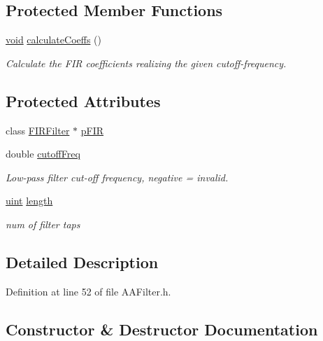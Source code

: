 \subsection*{Protected Member Functions}
\begin{DoxyCompactItemize}
\item 
\hyperlink{sound_8c_ae35f5844602719cf66324f4de2a658b3}{void} \hyperlink{classsoundtouch_1_1_a_a_filter_a122586bae2827f195210be2f85e26d4a}{calculate\+Coeffs} ()
\begin{DoxyCompactList}\small\item\em Calculate the F\+IR coefficients realizing the given cutoff-\/frequency. \end{DoxyCompactList}\end{DoxyCompactItemize}
\subsection*{Protected Attributes}
\begin{DoxyCompactItemize}
\item 
class \hyperlink{classsoundtouch_1_1_f_i_r_filter}{F\+I\+R\+Filter} $\ast$ \hyperlink{classsoundtouch_1_1_a_a_filter_af4db0cc118541b4d627e12412789c9e5}{p\+F\+IR}
\item 
double \hyperlink{classsoundtouch_1_1_a_a_filter_aae6ebe57383410c8f7e6eb7614293d50}{cutoff\+Freq}
\begin{DoxyCompactList}\small\item\em Low-\/pass filter cut-\/off frequency, negative = invalid. \end{DoxyCompactList}\item 
\hyperlink{_s_t_types_8h_a91ad9478d81a7aaf2593e8d9c3d06a14}{uint} \hyperlink{classsoundtouch_1_1_a_a_filter_a3c0b7fabd5293ccf4f509f3654ea1b9e}{length}
\begin{DoxyCompactList}\small\item\em num of filter taps \end{DoxyCompactList}\end{DoxyCompactItemize}


\subsection{Detailed Description}


Definition at line 52 of file A\+A\+Filter.\+h.



\subsection{Constructor \& Destructor Documentation}

